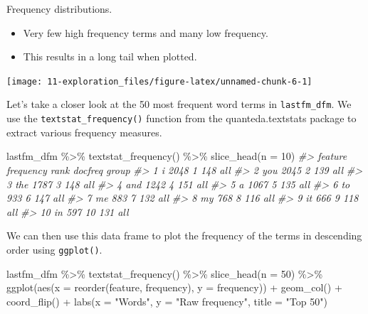 \documentclass[
]{article}
\newenvironment{Shaded}{\begin{snugshade}}{\end{snugshade}}
\newcommand{\AttributeTok}[1]{\textcolor[rgb]{0.77,0.63,0.00}{#1}}
\newcommand{\CommentTok}[1]{\textcolor[rgb]{0.56,0.35,0.01}{\textit{#1}}}
\newcommand{\DecValTok}[1]{\textcolor[rgb]{0.00,0.00,0.81}{#1}}
\newcommand{\FunctionTok}[1]{\textcolor[rgb]{0.00,0.00,0.00}{#1}}
\newcommand{\NormalTok}[1]{#1}
\newcommand{\SpecialCharTok}[1]{\textcolor[rgb]{0.00,0.00,0.00}{#1}}
\newcommand{\StringTok}[1]{\textcolor[rgb]{0.31,0.60,0.02}{#1}}
\providecommand{\tightlist}{%
  \setlength{\itemsep}{0pt}\setlength{\parskip}{0pt}}
\begin{document}
Frequency distributions.

\begin{itemize}
\tightlist
\item
  Very few high frequency terms and many low frequency.
\item
  This results in a long tail when plotted.
\end{itemize}

\begin{center}\texttt{[image: 11-exploration\_files/figure-latex/unnamed-chunk-6-1]} \end{center}

Let's take a closer look at the 50 most frequent word terms in \texttt{lastfm\_dfm}. We use the \texttt{textstat\_frequency()} function from the quanteda.textstats package to extract various frequency measures.

\begin{Shaded}
\begin{Highlighting}[]
\NormalTok{lastfm\_dfm }\SpecialCharTok{\%\textgreater{}\%}
    \FunctionTok{textstat\_frequency}\NormalTok{() }\SpecialCharTok{\%\textgreater{}\%}
    \FunctionTok{slice\_head}\NormalTok{(}\AttributeTok{n =} \DecValTok{10}\NormalTok{)}
\CommentTok{\#\textgreater{}    feature frequency rank docfreq group}
\CommentTok{\#\textgreater{} 1        i      2048    1     148   all}
\CommentTok{\#\textgreater{} 2      you      2045    2     139   all}
\CommentTok{\#\textgreater{} 3      the      1787    3     148   all}
\CommentTok{\#\textgreater{} 4      and      1242    4     151   all}
\CommentTok{\#\textgreater{} 5        a      1067    5     135   all}
\CommentTok{\#\textgreater{} 6       to       933    6     147   all}
\CommentTok{\#\textgreater{} 7       me       883    7     132   all}
\CommentTok{\#\textgreater{} 8       my       768    8     116   all}
\CommentTok{\#\textgreater{} 9       it       666    9     118   all}
\CommentTok{\#\textgreater{} 10      in       597   10     131   all}
\end{Highlighting}
\end{Shaded}

We can then use this data frame to plot the frequency of the terms in descending order using \texttt{ggplot()}.

\begin{Shaded}
\begin{Highlighting}[]
\NormalTok{lastfm\_dfm }\SpecialCharTok{\%\textgreater{}\%}
    \FunctionTok{textstat\_frequency}\NormalTok{() }\SpecialCharTok{\%\textgreater{}\%}
    \FunctionTok{slice\_head}\NormalTok{(}\AttributeTok{n =} \DecValTok{50}\NormalTok{) }\SpecialCharTok{\%\textgreater{}\%}
    \FunctionTok{ggplot}\NormalTok{(}\FunctionTok{aes}\NormalTok{(}\AttributeTok{x =} \FunctionTok{reorder}\NormalTok{(feature, frequency), }\AttributeTok{y =}\NormalTok{ frequency)) }\SpecialCharTok{+} \FunctionTok{geom\_col}\NormalTok{() }\SpecialCharTok{+} \FunctionTok{coord\_flip}\NormalTok{() }\SpecialCharTok{+}
    \FunctionTok{labs}\NormalTok{(}\AttributeTok{x =} \StringTok{"Words"}\NormalTok{, }\AttributeTok{y =} \StringTok{"Raw frequency"}\NormalTok{, }\AttributeTok{title =} \StringTok{"Top 50"}\NormalTok{)}
\end{Highlighting}
\end{Shaded}
\end{document}
